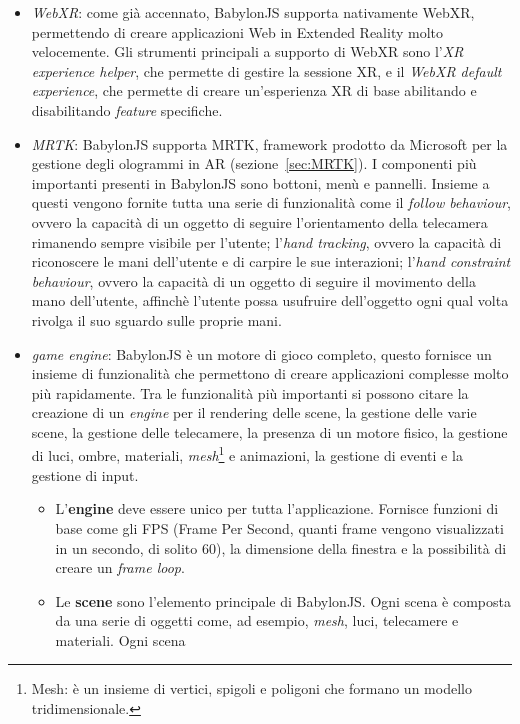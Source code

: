 \begin{itemize}
    \item \textit{WebXR}: come già accennato, BabylonJS supporta nativamente WebXR, permettendo di creare applicazioni Web in Extended Reality molto velocemente. Gli strumenti principali
    a supporto di WebXR sono l'\textit{XR experience helper}, che permette di gestire la sessione XR, e il \textit{WebXR default experience}, che permette di creare un'esperienza
    XR di base abilitando e disabilitando \textit{feature} specifiche. 
    \item \textit{MRTK}: BabylonJS supporta MRTK, framework prodotto da Microsoft per la gestione degli ologrammi in AR (sezione~\ref{sec:MRTK}). I componenti più importanti presenti in BabylonJS sono bottoni, menù e pannelli. Insieme a questi vengono fornite tutta una serie di funzionalità come il \textit{follow behaviour}, ovvero la capacità di un oggetto di seguire l'orientamento della telecamera rimanendo sempre visibile per l'utente; l'\textit{hand tracking}, ovvero la capacità di riconoscere le mani dell'utente e di carpire le sue interazioni; l'\textit{hand constraint behaviour}, ovvero la capacità di un oggetto di seguire il movimento della mano dell'utente, affinchè l'utente possa usufruire dell'oggetto ogni qual volta rivolga il suo sguardo sulle proprie mani.
    \item \textit{game engine}: BabylonJS è un motore di gioco completo, questo fornisce un insieme di funzionalità che permettono di creare applicazioni complesse molto più rapidamente.
    Tra le funzionalità più importanti si possono citare la creazione di un \textit{engine} per il rendering delle scene, la gestione delle varie scene, la gestione delle telecamere,
    la presenza di un motore fisico, la gestione di luci, ombre, materiali, \textit{mesh}\footnote{Mesh: è un insieme di vertici, spigoli e poligoni che formano un modello tridimensionale.}
    e animazioni, la gestione di eventi e la gestione di input.
    \begin{itemize}
        \item L'\textbf{engine} deve essere unico per tutta l'applicazione. Fornisce funzioni di base come gli FPS (Frame Per Second, quanti frame vengono visualizzati in un secondo,
        di solito 60), la dimensione della finestra e la possibilità di creare un \textit{frame loop}.
        \item Le \textbf{scene} sono l'elemento principale di BabylonJS. Ogni scena è composta da una serie di oggetti come, ad esempio, \textit{mesh}, luci, telecamere e materiali. Ogni scena

\end{itemize}
\end{itemize}
